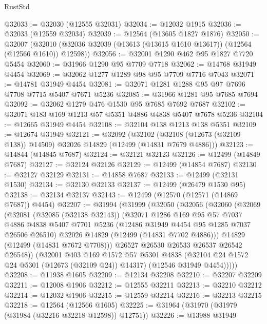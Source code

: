 \begin{lexlean}{RustStd}
\begin{coremodule}
@32033 := @32030 (@12555 @32031)
@32034 := @12032 @1915
@32036 := @32033 (@12559 @32034)
@32039 := @12564 (@13605 @1827 @1876)
@32050 := @32007
    (@32010 (@32036 @32039 (@13613 (@13615 @1610 @13617)) (@12564 (@12566 @1610)) @12598))
@32056 := @32001 @1290 @462 @95 @1827 @7720 @5454
@32060 := @31966 @1290 @95 @7709 @7718
@32062 := @14768 @31949 @4454
@32069 := @32062 @1277 @1289 @98 @95 @7709 @7716 @7043
@32071 := @14781 @31949 @4454
@32081 := @32071 @1281 @1288 @95 @97 @7696 @7708 @7715 @5407 @7671 @5236
@32085 := @31966 @1281 @95 @7685 @7694
@32092 := @32062 @1279 @476 @1530 @95 @7685 @7692 @7687
@32102 := @32071 @183 @169 @1213 @57 @5351 @4886 @4838 @5407 @7678 @5236
@32104 := @12665 @31949 @4454
@32108 := @32104 @138 @1213 @138 @5351
@32109 := @12674 @31949
@32121 := @32092
    (@32102 (@32108 (@12673 (@32109 @138)) @14509) @32026 @14829 (@12499 (@14831 @7679 @4886)))
@32123 := @14844 (@14845 @7687)
@32124 := @32121 @32123
@32126 := @12499 (@14849 @7687)
@32127 := @32124 @32126
@32129 := @12499 (@14854 @7687)
@32130 := @32127 @32129
@32131 := @14858 @7687
@32133 := @12499 (@32131 @1530)
@32134 := @32130 @32133
@32137 := @12499 (@26479 @1530 @95)
@32138 := @32134 @32137
@32143 := @12499 (@12570 (@12571 (@14869 @7687)) @4454)
@32207 := @31994
    (@31999
      (@32050
        (@32056
          (@32060
            (@32069
              (@32081
                (@32085 (@32138 @32143))
                (@32071
                  @1286
                  @169
                  @95
                  @57
                  @7037
                  @4886
                  @4838
                  @5407
                  @7701
                  @5236
                  (@12486 @31949 @4454 @95 @1285 @7037 @26506 @26510)
                  @32026
                  @14829
                  (@12499 (@14831 @7702 @4886)))
                @14829
                (@12499 (@14831 @7672 @7708)))
              @26527
              @26530
              @26533
              @26537
              @26542
              @26548))
          (@32001
            @403
            @169
            @1572
            @57
            @5301
            @4838
            (@32104 @24 @1572 @24 @5301 (@12673 (@32109 @24)) @14317)
            (@12546 @31949 @4454)))))
@32208 := @11938 @1605
@32209 := @12134 @32208
@32210 := @32207 @32209
@32211 := @12008 @1906
@32212 := @12555 @32211
@32213 := @32210 @32212
@32214 := @12032 @1906
@32215 := @12559 @32214
@32216 := @32213 @32215
@32218 := @12564 (@12566 @1605)
@32225 := @31964 (@31970 (@31979 (@31984 (@32216 @32218 @12598)) @12751))
@32226 := @13988 @31949

\end{coremodule}
\end{lexlean}
